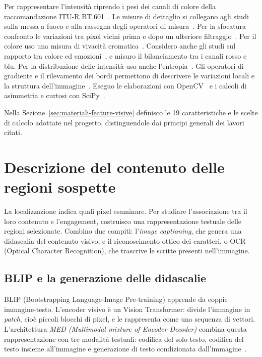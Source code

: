 Per rappresentare l'intensità riprendo i pesi dei canali di colore della raccomandazione ITU-R BT.601~\cite{itu_bt601}. Le misure di dettaglio si collegano agli studi sulla messa a fuoco e alla rassegna degli operatori di misura~\cite{903548,PERTUZ20131415}. Per la sfocatura confronto le variazioni tra pixel vicini prima e dopo un ulteriore filtraggio~\cite{creteroffet:hal-00232709}. Per il colore uso una misura di vivacità cromatica~\cite{10.1117/12.477378}. Considero anche gli studi sul rapporto tra colore ed emozioni~\cite{Jonauskaite2024}, e misuro il bilanciamento tra i canali rosso e blu. Per la distribuzione delle intensità uso anche l'entropia~\cite{6773024}. Gli operatori di gradiente e il rilevamento dei bordi permettono di descrivere le variazioni locali e la struttura dell'immagine~\cite{996,4767851}. Eseguo le elaborazioni con OpenCV~\cite{opencv_library} e i calcoli di asimmetria e curtosi con SciPy~\cite{2020SciPy-NMeth}.

Nella Sezione~\ref{sec:materiali-feature-visive} definisco le 19 caratteristiche e le scelte di calcolo adottate nel progetto, distinguendole dai principi generali dei lavori citati.

\section{Descrizione del contenuto delle regioni sospette}
\label{sec:background-descrizioni}

La localizzazione indica quali pixel esaminare. Per studiare l'associazione tra il loro contenuto e l'engagement, costruisco una rappresentazione testuale delle regioni selezionate. Combino due compiti: l'\emph{image captioning}, che genera una didascalia del contenuto visivo, e il riconoscimento ottico dei caratteri, o OCR (Optical Character Recognition), che trascrive le scritte presenti nell'immagine.

\subsection{BLIP e la generazione delle didascalie}
\label{subsec:background-blip}

BLIP (Bootstrapping Language-Image Pre-training) apprende da coppie immagine-testo. L'encoder visivo è un Vision Transformer: divide l'immagine in \emph{patch}, cioè piccoli blocchi di pixel, e le rappresenta come una sequenza di vettori. L'architettura \emph{MED (Multimodal mixture of Encoder-Decoder)} combina questa rappresentazione con tre modalità testuali: codifica del solo testo, codifica del testo insieme all'immagine e generazione di testo condizionata dall'immagine~\cite{pmlr-v162-li22n}.

